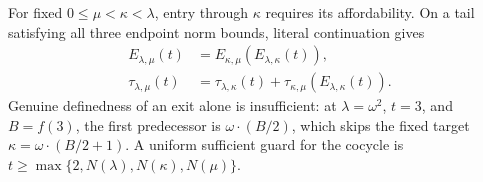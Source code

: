 For fixed \(0\le\mu<\kappa<\lambda\), entry through \(\kappa\) requires
its affordability. On a tail satisfying all three endpoint norm bounds,
literal continuation gives
\begin{equation}\label{eq:cocycle}
 \begin{split}
 E_{\lambda,\mu}(t)&=
 E_{\kappa,\mu}(E_{\lambda,\kappa}(t)),\\
 \tau_{\lambda,\mu}(t)&=\tau_{\lambda,\kappa}(t)+
 \tau_{\kappa,\mu}(E_{\lambda,\kappa}(t)).
 \end{split}
\end{equation}
Genuine definedness of an exit alone is insufficient: at \(\lambda=\omega^2\),
\(t=3\), and \(B=f(3)\), the first predecessor is
\(\omega\cdot(B/2)\), which skips the fixed target
\(\kappa=\omega\cdot(B/2+1)\). A uniform sufficient guard for the
cocycle is \(t\ge\max\{2,N(\lambda),N(\kappa),N(\mu)\}\).

